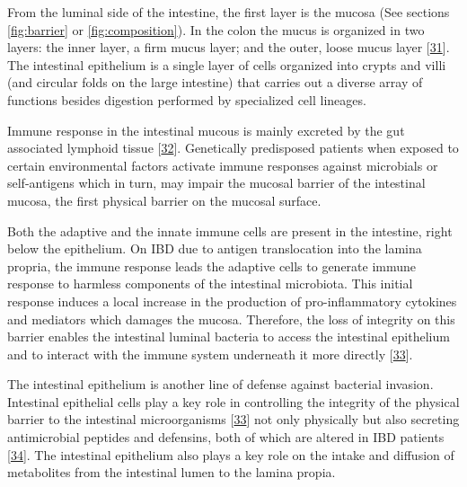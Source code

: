 \documentclass[
  12pt,
  a4paper,
  twoside,
  openright]{book}
\begin{document}
From the luminal side of the intestine, the first layer is the mucosa (See sections \ref{fig:barrier} or \ref{fig:composition}).
In the colon the mucus is organized in two layers: the inner layer, a firm mucus layer; and the outer, loose mucus layer {[}\protect\hyperlink{ref-okumura2017}{31}{]}.
The intestinal epithelium is a single layer of cells organized into crypts and villi (and circular folds on the large intestine) that carries out a diverse array of functions besides digestion performed by specialized cell lineages.

Immune response in the intestinal mucous is mainly excreted by the gut associated lymphoid tissue {[}\protect\hyperlink{ref-faria2012}{32}{]}.
Genetically predisposed patients when exposed to certain environmental factors activate immune responses against microbials or self-antigens which in turn, may impair the mucosal barrier of the intestinal mucosa, the first physical barrier on the mucosal surface.

Both the adaptive and the innate immune cells are present in the intestine, right below the epithelium.
On IBD due to antigen translocation into the lamina propria, the immune response leads the adaptive cells to generate immune response to harmless components of the intestinal microbiota.
This initial response induces a local increase in the production of pro-inflammatory cytokines and mediators which damages the mucosa.
Therefore, the loss of integrity on this barrier enables the intestinal luminal bacteria to access the intestinal epithelium and to interact with the immune system underneath it more directly {[}\protect\hyperlink{ref-hisamatsu2013}{33}{]}.

The intestinal epithelium is another line of defense against bacterial invasion.
Intestinal epithelial cells play a key role in controlling the integrity of the physical barrier to the intestinal microorganisms {[}\protect\hyperlink{ref-hisamatsu2013}{33}{]} not only physically but also secreting antimicrobial peptides and defensins, both of which are altered in IBD patients {[}\protect\hyperlink{ref-michielan2015}{34}{]}.
The intestinal epithelium also plays a key role on the intake and diffusion of metabolites from the intestinal lumen to the lamina propia.
\end{document}

